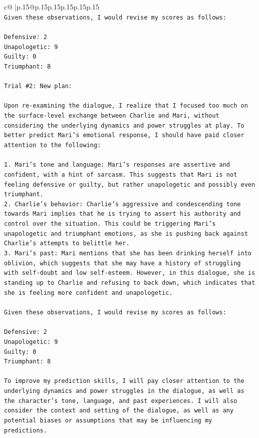\documentclass{article}
\begin{document}
{\begin{supertabular}{c@{$\;$}|p{.15\linewidth}@{}p{.15\linewidth}p{.15\linewidth}p{.15\linewidth}p{.15\linewidth}p{.15\linewidth}}
{{{\\ 
\texttt{Given these observations, I would revise my scores as follows:} \\
\\ 
\texttt{Defensive: 2} \\
\texttt{Unapologetic: 9} \\
\texttt{Guilty: 0} \\
\texttt{Triumphant: 8} \\
\\ 
\texttt{Trial \#2: New plan: } \\
\\ 
\texttt{Upon re{-}examining the dialogue, I realize that I focused too much on the surface{-}level exchange between Charlie and Mari, without considering the underlying dynamics and power struggles at play. To better predict Mari's emotional response, I should have paid closer attention to the following:} \\
\\ 
\texttt{1. Mari's tone and language: Mari's responses are assertive and confident, with a hint of sarcasm. This suggests that Mari is not feeling defensive or guilty, but rather unapologetic and possibly even triumphant.} \\
\texttt{2. Charlie's behavior: Charlie's aggressive and condescending tone towards Mari implies that he is trying to assert his authority and control over the situation. This could be triggering Mari's unapologetic and triumphant emotions, as she is pushing back against Charlie's attempts to belittle her.} \\
\texttt{3. Mari's past: Mari mentions that she has been drinking herself into oblivion, which suggests that she may have a history of struggling with self{-}doubt and low self{-}esteem. However, in this dialogue, she is standing up to Charlie and refusing to back down, which indicates that she is feeling more confident and unapologetic.} \\
\\ 
\texttt{Given these observations, I would revise my scores as follows:} \\
\\ 
\texttt{Defensive: 2} \\
\texttt{Unapologetic: 9} \\
\texttt{Guilty: 0} \\
\texttt{Triumphant: 8} \\
\\ 
\texttt{To improve my prediction skills, I will pay closer attention to the underlying dynamics and power struggles in the dialogue, as well as the character's tone, language, and past experiences. I will also consider the context and setting of the dialogue, as well as any potential biases or assumptions that may be influencing my predictions.} \\
}}}
\end{supertabular}}
\end{document}
